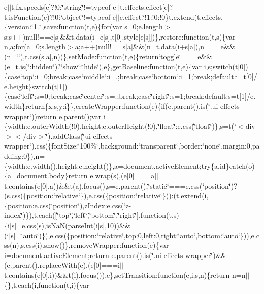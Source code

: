 \begin{DoxyCompactItemize}
e$\vert$$\vert$t.\+fx.\+speeds\mbox{[}e\mbox{]}?!0\+:\char`\"{}string\char`\"{}!=typeof e$\vert$$\vert$t.\+effects.\+effect\mbox{[}e\mbox{]}?t.\+is\+Function(e)?!0\+:\char`\"{}object\char`\"{}!=typeof e$\vert$$\vert$e.\+effect?!1\+:!0\+:!0\}t.\+extend(t.\+effects,\{version\+:\char`\"{}1..\char`\"{},save\+:function(t,e)\{for(var s=0;e.\+length$>$s;s++)null!==e\mbox{[}s\mbox{]}\&\&t.\+data(i+e\mbox{[}s\mbox{]},t\mbox{[}0\mbox{]}.\+style\mbox{[}e\mbox{[}s\mbox{]}\mbox{]})\},restore\+:function(t,s)\{var n,a;for(a=0;s.\+length$>$a;a++)null!==s\mbox{[}a\mbox{]}\&\&(n=t.\+data(i+s\mbox{[}a\mbox{]}),n===e\&\&(n=\char`\"{}\char`\"{}),t.\+css(s\mbox{[}a\mbox{]},n))\},set\+Mode\+:function(t,e)\{return\char`\"{}toggle\char`\"{}===e\&\&(e=t.\+is(\char`\"{}\+:hidden\char`\"{})?\char`\"{}show\char`\"{}\+:\char`\"{}hide\char`\"{}),e\},get\+Baseline\+:function(t,e)\{var i,s;switch(t\mbox{[}0\mbox{]})\{case\char`\"{}top\char`\"{}\+:i=0;break;case\char`\"{}middle\char`\"{}\+:i=.;break;case\char`\"{}bottom\char`\"{}\+:i=1;break;default\+:i=t\mbox{[}0\mbox{]}/e.\+height\}switch(t\mbox{[}1\mbox{]})\{case\char`\"{}left\char`\"{}\+:s=0;break;case\char`\"{}center\char`\"{}\+:s=.;break;case\char`\"{}right\char`\"{}\+:s=1;break;default\+:s=t\mbox{[}1\mbox{]}/e.\+width\}return\{x\+:s,y\+:i\}\},create\+Wrapper\+:function(e)\{if(e.\+parent().\+is(\char`\"{}.\+ui-\/effects-\/wrapper\char`\"{}))return e.\+parent();var i=\{width\+:e.\+outer\+Width(!0),height\+:e.\+outer\+Height(!0),\char`\"{}float\char`\"{}\+:e.\+css(\char`\"{}float\char`\"{})\},s=t(\char`\"{}$<$div$>$$<$/div$>$\char`\"{}).\+add\+Class(\char`\"{}ui-\/effects-\/wrapper\char`\"{}).\+css(\{font\+Size\+:\char`\"{}100\%\char`\"{},background\+:\char`\"{}transparent\char`\"{},border\+:\char`\"{}none\char`\"{},margin\+:0,padding\+:0\}),n=\{width\+:e.\+width(),height\+:e.\+height()\},a=document.\+active\+Element;try\{a.\+id\}catch(o)\{a=document.\+body\}return e.\+wrap(s),(e\mbox{[}0\mbox{]}===a$\vert$$\vert$t.\+contains(e\mbox{[}0\mbox{]},a))\&\&t(a).\+focus(),s=e.\+parent(),\char`\"{}static\char`\"{}===e.\+css(\char`\"{}position\char`\"{})?(s.\+css(\{position\+:\char`\"{}relative\char`\"{}\}),e.\+css(\{position\+:\char`\"{}relative\char`\"{}\}))\+:(t.\+extend(i,\{position\+:e.\+css(\char`\"{}position\char`\"{}),z\+Index\+:e.\+css(\char`\"{}z-\/index\char`\"{})\}),t.\+each(\mbox{[}\char`\"{}top\char`\"{},\char`\"{}left\char`\"{},\char`\"{}bottom\char`\"{},\char`\"{}right\char`\"{}\mbox{]},function(t,s)\{i\mbox{[}s\mbox{]}=e.\+css(s),is\+Na\+N(parse\+Int(i\mbox{[}s\mbox{]},10))\&\&(i\mbox{[}s\mbox{]}=\char`\"{}auto\char`\"{})\}),e.\+css(\{position\+:\char`\"{}relative\char`\"{},top\+:0,left\+:0,right\+:\char`\"{}auto\char`\"{},bottom\+:\char`\"{}auto\char`\"{}\})),e.\+css(n),s.\+css(i).\+show()\},remove\+Wrapper\+:function(e)\{var i=document.\+active\+Element;return e.\+parent().\+is(\char`\"{}.\+ui-\/effects-\/wrapper\char`\"{})\&\&(e.\+parent().\+replace\+With(e),(e\mbox{[}0\mbox{]}===i$\vert$$\vert$t.\+contains(e\mbox{[}0\mbox{]},i))\&\&t(i).\+focus()),e\},set\+Transition\+:function(e,i,s,n)\{return n=n$\vert$$\vert$\{\},t.\+each(i,function(t,i)\{var 
\end{DoxyCompactItemize}
